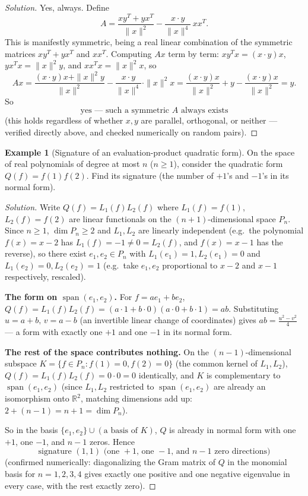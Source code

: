 \documentclass[11pt]{article}
\theoremstyle{definition}
\newtheorem{example}{Example}[section]
\newcommand{\R}{\mathbb{R}}
\newcommand{\Span}{\operatorname{span}}
\begin{document}
\begin{proof}[Solution]
Yes, always. Define
\[
A=\frac{xy^T+yx^T}{\|x\|^2}-\frac{x\cdot y}{\|x\|^4}\,xx^T.
\]
This is manifestly symmetric, being a real linear combination of the symmetric matrices $xy^T+yx^T$ and $xx^T$. Computing $Ax$ term by term: $xy^Tx=(x\cdot y)x$, $yx^Tx=\|x\|^2y$, and $xx^Tx=\|x\|^2x$, so
\[
Ax=\frac{(x\cdot y)x+\|x\|^2y}{\|x\|^2}-\frac{x\cdot y}{\|x\|^4}\cdot\|x\|^2x=\frac{(x\cdot y)x}{\|x\|^2}+y-\frac{(x\cdot y)x}{\|x\|^2}=y.
\]
So
\[
\boxed{\text{yes — such a symmetric } A \text{ always exists}}
\]
(this holds regardless of whether $x,y$ are parallel, orthogonal, or neither — verified directly above, and checked numerically on random pairs).
\end{proof}

\begin{example}[Signature of an evaluation-product quadratic form]
On the space of real polynomials of degree at most $n$ ($n\ge1$), consider the quadratic form $Q(f)=f(1)f(2)$. Find its signature (the number of $+1$'s and $-1$'s in its normal form).
\end{example}

\begin{proof}[Solution]
Write $Q(f)=L_1(f)L_2(f)$ where $L_1(f)=f(1)$, $L_2(f)=f(2)$ are linear functionals on the $(n+1)$-dimensional space $P_n$. Since $n\ge1$, $\dim P_n\ge2$ and $L_1,L_2$ are linearly independent (e.g.\ the polynomial $f(x)=x-2$ has $L_1(f)=-1\neq0=L_2(f)$, and $f(x)=x-1$ has the reverse), so there exist $e_1,e_2\in P_n$ with $L_1(e_1)=1,L_2(e_1)=0$ and $L_1(e_2)=0,L_2(e_2)=1$ (e.g.\ take $e_1,e_2$ proportional to $x-2$ and $x-1$ respectively, rescaled).

\textbf{The form on $\Span(e_1,e_2)$.} For $f=ae_1+be_2$, $Q(f)=L_1(f)L_2(f)=(a\cdot1+b\cdot0)(a\cdot0+b\cdot1)=ab$. Substituting $u=a+b,\,v=a-b$ (an invertible linear change of coordinates) gives $ab=\tfrac{u^2-v^2}4$ — a form with exactly one $+1$ and one $-1$ in its normal form.

\textbf{The rest of the space contributes nothing.} On the $(n-1)$-dimensional subspace $K=\{f\in P_n: f(1)=0,f(2)=0\}$ (the common kernel of $L_1,L_2$), $Q(f)=L_1(f)L_2(f)=0\cdot0=0$ identically, and $K$ is complementary to $\Span(e_1,e_2)$ (since $L_1,L_2$ restricted to $\Span(e_1,e_2)$ are already an isomorphism onto $\R^2$, matching dimensions add up: $2+(n-1)=n+1=\dim P_n$).

So in the basis $\{e_1,e_2\}\cup(\text{a basis of }K)$, $Q$ is already in normal form with one $+1$, one $-1$, and $n-1$ zeros. Hence
\[
\boxed{\text{signature } (1,1) \text{ (one } +1 \text{, one } -1\text{, and } n-1 \text{ zero directions)}}
\]
(confirmed numerically: diagonalizing the Gram matrix of $Q$ in the monomial basis for $n=1,2,3,4$ gives exactly one positive and one negative eigenvalue in every case, with the rest exactly zero).
\end{proof}
\end{document}
